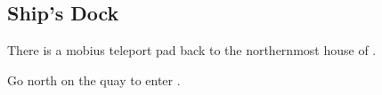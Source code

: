 \subsection{Ship's Dock}
\label{map:ships_dock}

There is a mobius teleport pad back to the northernmost house of .

Go north on the quay to enter .
